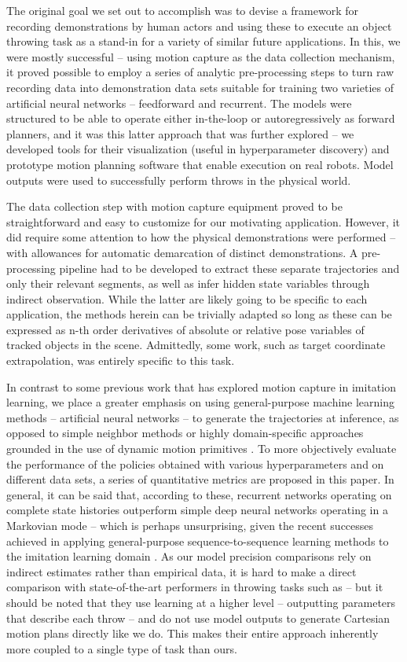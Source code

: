 \documentclass{article}
\begin{document}
The original goal we set out to accomplish was to devise a framework for recording demonstrations by human actors and using these to execute an object throwing task as a stand-in for a variety of similar future applications. In this, we were mostly successful -- using motion capture as the data collection mechanism, it proved possible to employ a series of analytic pre-processing steps to turn raw recording data into demonstration data sets suitable for training two varieties of artificial neural networks -- feedforward and recurrent. The models were structured to be able to operate either in-the-loop or autoregressively as forward planners, and it was this latter approach that was further explored -- we developed tools for their visualization (useful in hyperparameter discovery) and prototype motion planning software that enable execution on real robots. Model outputs were used to successfully perform throws in the physical world.

The data collection step with motion capture equipment proved to be straightforward and easy to customize for our motivating application. However, it did require some attention to how the physical demonstrations were performed -- with allowances for automatic demarcation of distinct demonstrations. A pre-processing pipeline had to be developed to extract these separate trajectories and only their relevant segments, as well as infer hidden state variables through indirect observation. While the latter are likely going to be specific to each application, the methods herein can be trivially adapted so long as these can be expressed as n-th order derivatives of absolute or relative pose variables of tracked objects in the scene. Admittedly, some work, such as target coordinate extrapolation, was entirely specific to this task. 

In contrast to some previous work that has explored motion capture in imitation learning, we place a greater emphasis on using general-purpose machine learning methods -- artificial neural networks -- to generate the trajectories at inference, as opposed to simple neighbor methods \citep{jha2017imitation} or highly domain-specific approaches grounded in the use of dynamic motion primitives \citep{vuga2013mocap}. To more objectively evaluate the performance of the policies obtained with various hyperparameters and on different data sets, a series of quantitative metrics are proposed in this paper. In general, it can be said that, according to these, recurrent networks operating on complete state histories outperform simple deep neural networks operating in a Markovian mode -- which is perhaps unsurprising, given the recent successes achieved in applying general-purpose sequence-to-sequence learning methods to the imitation learning domain \citep{reed2022generalist}. As our model precision comparisons rely on indirect estimates rather than empirical data, it is hard to make a direct comparison with state-of-the-art performers in throwing tasks such as \citep{zeng2020tossingbot} -- but it should be noted that they use learning at a higher level -- outputting parameters that describe each throw -- and do not use model outputs to generate Cartesian motion plans directly like we do. This makes their entire approach inherently more coupled to a single type of task than ours.
\end{document}
